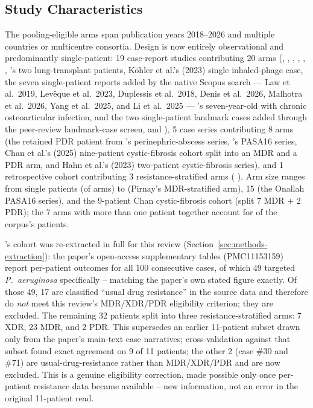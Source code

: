 \subsection{Study Characteristics}
\label{sec:results-characteristics}

The \ArmsAnalysed pooling-eligible arms span publication years 2018--2026 and multiple countries or multicentre consortia. Design is now entirely observational and predominantly single-patient: 19 case-report studies contributing 20 arms (\textcite{Tkhilaishvili2020_aac}, \textcite{Blasco2023_frontmed}, \textcite{Ferry2022_natcomms}, \textcite{Ngauy2026_asmcr}, \textcite{Racenis2022_frontmed}, \textcite{Racenis2023_viruses}, \citeauthor{Aslam2019_ajt}'s \citeyear{Aslam2019_ajt} two lung-transplant patients, K\"ohler et al.'s (2023) single inhaled-phage case, the seven single-patient reports added by the native Scopus search --- Law et al.\ 2019, Lev\^eque et al.\ 2023, Duplessis et al.\ 2018, Denis et al.\ 2026, Malhotra et al.\ 2026, Yang et al.\ 2025, and Li et al.\ 2025 --- \textcite{Khatami2021_embo}'s seven-year-old with chronic osteoarticular infection, and the two single-patient landmark cases added through the peer-review landmark-case screen, \textcite{Chan2018_omko1_emph} and \textcite{Arya2026_pji_natcomms}), 5 case series contributing 8 arms (the retained PDR patient from \citeauthor{Liu2025_mlife_perinephric}'s \citeyear{Liu2025_mlife_perinephric} perinephric-abscess series, \citeauthor{Onallah2023_med}'s \citeyear{Onallah2023_med} PASA16 series, Chan et al.'s (2025) nine-patient cystic-fibrosis cohort split into an MDR and a PDR arm, and Hahn et al.'s (2023) two-patient cystic-fibrosis series), and 1 retrospective cohort contributing 3 resistance-stratified arms (\citeauthor{Pirnay2024_natmicrobiol} \citeyear{Pirnay2024_natmicrobiol}). Arm size ranges from single patients (\SinglePatientArms of \ArmsAnalysed arms) to \LargestArmSize (Pirnay's MDR-stratified arm), 15 (the Onallah PASA16 series), and the 9-patient Chan cystic-fibrosis cohort (split 7 MDR + 2 PDR); the 7 arms with more than one patient together account for \MultiPatientPatients of the corpus's \PatientsAnalysed patients.

\citeauthor{Pirnay2024_natmicrobiol}'s cohort was re-extracted in full for this review (Section~\ref{sec:methods-extraction}): the paper's open-access supplementary tables (PMC11153159) report per-patient outcomes for all 100 consecutive cases, of which 49 targeted \textit{P.\ aeruginosa} specifically -- matching the paper's own stated figure exactly. Of those 49, 17 are classified ``usual drug resistance'' in the source data and therefore do \emph{not} meet this review's MDR/XDR/PDR eligibility criterion; they are excluded. The remaining 32 patients split into three resistance-stratified arms: 7 XDR, 23 MDR, and 2 PDR. This supersedes an earlier 11-patient subset drawn only from the paper's main-text case narratives; cross-validation against that subset found exact agreement on 9 of 11 patients; the other 2 (case \#30 and \#71) are usual-drug-resistance rather than MDR/XDR/PDR and are now excluded. This is a genuine eligibility correction, made possible only once per-patient resistance data became available -- new information, not an error in the original 11-patient read.

